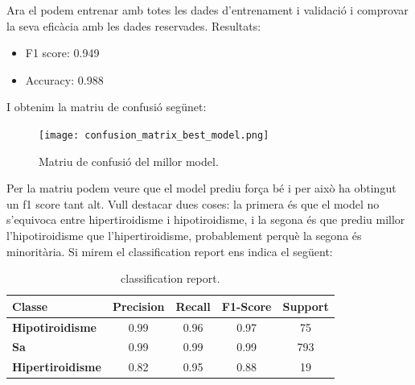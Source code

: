 \documentclass[9pt,a4paper,twoside]{tau-class/tau}
\begin{document}
    Ara el podem entrenar amb totes les dades d'entrenament i validació i comprovar la seva eficàcia amb les dades reservades. Resultats:
    \begin{itemize}
        \item F1 score: 0.949
        \item Accuracy: 0.988
    \end{itemize}
    I obtenim la matriu de confusió segünet:
    \begin{figure}[H]
        \centering
        \texttt{[image: confusion\_matrix\_best\_model.png]}
        \caption{Matriu de confusió del millor model.}
        \label{fig:figure13}
    \end{figure}
    Per la matriu podem veure que el model prediu força bé i per això ha obtingut un f1 score tant alt. Vull destacar dues coses: la primera és que el model no s'equivoca entre hipertiroidisme i hipotiroidisme, i la segona és que prediu millor l'hipotiroidisme que l'hipertiroidisme, probablement perquè la segona és minoritària.
    Si mirem el classification report ens indica el següent:
    \begin{table}[h]
        \centering
        \begin{tabular}{lcccc}
        \toprule
         \textbf{Classe} & \textbf{Precision} & \textbf{Recall} & \textbf{F1-Score} & \textbf{Support} \\
        \midrule
        \textbf{Hipotiroidisme} & 0.99 & 0.96 & 0.97 & 75 \\
        \textbf{Sa} & 0.99 & 0.99 & 0.99 & 793 \\
        \textbf{Hipertiroidisme} & 0.82 & 0.95 & 0.88 & 19 \\
        \bottomrule
        \end{tabular}
        \caption{classification report.}
        \label{tab:classification_results}
    \end{table}
        
\end{document}
